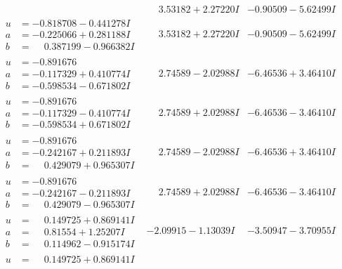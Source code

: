 \documentclass[1p]{elsarticle_modified}
\theoremstyle{definition}
\begin{document}
$$\begin{array}{c|c|c}
 & \phantom{-}3.53182 + 2.27220 I & -0.90509 - 5.62499 I \\ \hline\begin{aligned}
u &= -0.818708 - 0.441278 I \\
a &= -0.225066 + 0.281188 I \\
b &= \phantom{-}0.387199 - 0.966382 I\end{aligned}
 & \phantom{-}3.53182 + 2.27220 I & -0.90509 - 5.62499 I \\ \hline\begin{aligned}
u &= -0.891676\phantom{ +0.000000I} \\
a &= -0.117329 + 0.410774 I \\
b &= -0.598534 - 0.671802 I\end{aligned}
 & \phantom{-}2.74589 - 2.02988 I & -6.46536 + 3.46410 I \\ \hline\begin{aligned}
u &= -0.891676\phantom{ +0.000000I} \\
a &= -0.117329 - 0.410774 I \\
b &= -0.598534 + 0.671802 I\end{aligned}
 & \phantom{-}2.74589 + 2.02988 I & -6.46536 - 3.46410 I \\ \hline\begin{aligned}
u &= -0.891676\phantom{ +0.000000I} \\
a &= -0.242167 + 0.211893 I \\
b &= \phantom{-}0.429079 + 0.965307 I\end{aligned}
 & \phantom{-}2.74589 - 2.02988 I & -6.46536 + 3.46410 I \\ \hline\begin{aligned}
u &= -0.891676\phantom{ +0.000000I} \\
a &= -0.242167 - 0.211893 I \\
b &= \phantom{-}0.429079 - 0.965307 I\end{aligned}
 & \phantom{-}2.74589 + 2.02988 I & -6.46536 - 3.46410 I \\ \hline\begin{aligned}
u &= \phantom{-}0.149725 + 0.869141 I \\
a &= \phantom{-}0.81554 + 1.25207 I \\
b &= \phantom{-}0.114962 - 0.915174 I\end{aligned}
 & -2.09915 - 1.13039 I & -3.50947 - 3.70955 I \\ \hline\begin{aligned}
u &= \phantom{-}0.149725 + 0.869141 I \\

\end{aligned}
\end{array}$$
\end{document}
